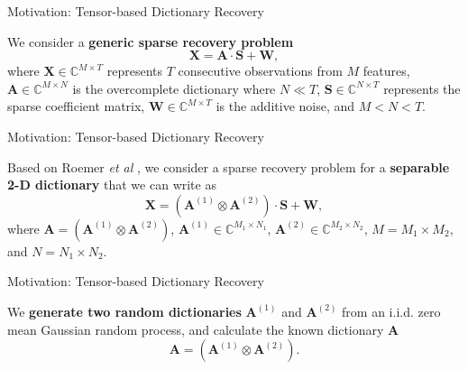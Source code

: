 \documentclass[newPxFont, numfooter, sectionpages]{beamer}
\begin{document}
\begin{frame}[c]{Motivation: Tensor-based Dictionary Recovery}

	We consider a \textbf{generic sparse recovery problem}
	\begin{equation}\label{eq:4_eq01}
		\textbf{X} = \textbf{A} \cdot \textbf{S} + \textbf{W},
	\end{equation}
	where $\textbf{X} \in \mathbb{C}^{M \times T}$ represents $T$ consecutive observations from $M$ features, $\textbf{A} \in \mathbb{C}^{M \times N}$ is the overcomplete dictionary where $N \ll T$, $\textbf{S} \in \mathbb{C}^{N \times T}$ represents the sparse coefficient matrix, $\textbf{W} \in \mathbb{C}^{M \times T}$ is the additive noise, and $M < N < T$.

\end{frame}
\begin{frame}[c]{Motivation: Tensor-based Dictionary Recovery}

	Based on Roemer \emph{et al} \cite{roemer2014tensor}, we consider a sparse recovery problem for a \textbf{separable 2-D dictionary} that we can write as
	\begin{equation}\label{eq:4_eq02}
		\textbf{X} = (\textbf{A}^{(1)} \otimes \textbf{A}^{(2)}) \cdot \textbf{S} + \textbf{W},
	\end{equation}
	where $\textbf{A} = (\textbf{A}^{(1)} \otimes \textbf{A}^{(2)})$, $\textbf{A}^{(1)} \in \mathbb{C}^{M_1 \times N_1}$, $\textbf{A}^{(2)} \in \mathbb{C}^{M_2 \times N_2}$, $M = M_1 \times M_2$, and $N = N_1 \times N_2$.

\end{frame}
\begin{frame}[c]{Motivation: Tensor-based Dictionary Recovery}

	We \textbf{generate two random dictionaries} $\textbf{A}^{(1)}$ and $\textbf{A}^{(2)}$ from an i.i.d. zero mean Gaussian random process, and calculate the known dictionary $\textbf{A}$
	\begin{equation}\label{eq:4_eq03}
		\textbf{A} = (\textbf{A}^{(1)} \otimes \textbf{A}^{(2)}).
	\end{equation}

\end{frame}
\end{document}
